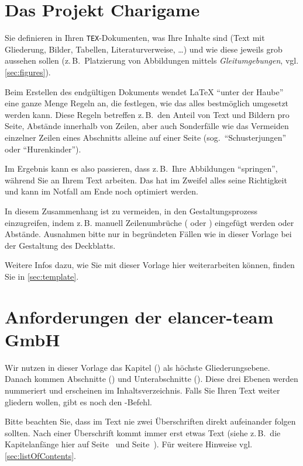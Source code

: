 \section{Das Projekt Charigame}
\label{sec:hood}
Sie definieren in Ihren \texttt{TEX}-Dokumenten, was Ihre Inhalte sind (Text mit Gliederung, Bilder, Tabellen, Literaturverweise, \ldots) und wie diese jeweils grob aussehen sollen (z.\,B.\ Platzierung von Abbildungen mittels \emph{Gleitumgebungen}, vgl. \cref{sec:figures}).
\par
Beim Erstellen des endgültigen Dokuments wendet \LaTeX{} \enquote{unter der Haube} eine ganze Menge Regeln an, die festlegen, wie das alles bestmöglich umgesetzt werden kann. Diese Regeln betreffen z.\,B.\ den Anteil von Text und Bildern pro Seite, Abstände innerhalb von Zeilen, aber auch Sonderfälle wie das Vermeiden einzelner Zeilen eines Abschnitts alleine auf einer Seite (sog.\ \enquote{Schusterjungen} oder \enquote{Hurenkinder}).
\par
Im Ergebnis kann es also passieren, dass z.\,B.\ Ihre Abbildungen \enquote{springen}, während Sie an Ihrem Text arbeiten. Das hat im Zweifel alles seine Richtigkeit und kann im Notfall am Ende noch optimiert werden.
\par
In diesem Zusammenhang ist zu vermeiden, in den Gestaltungsprozess einzugreifen, indem z.\,B. manuell Zeilenumbrüche ( oder \comm{\textbackslash}) eingefügt werden oder Abstände. Ausnahmen bitte nur in begründeten Fällen wie in dieser Vorlage bei der Gestaltung des Deckblatts.
\par
Weitere Infos dazu, wie Sie mit dieser Vorlage hier weiterarbeiten können, finden Sie in \cref{sec:template}.
%
%
\section{Anforderungen der elancer-team GmbH}
\label{sec:headings}
Wir nutzen in dieser Vorlage das Kapitel () als höchste Gliederungsebene. Danach kommen Abschnitte () und Unterabschnitte (). Diese drei Ebenen werden nummeriert und erscheinen im Inhaltsverzeichnis. Falls Sie Ihren Text weiter gliedern wollen, gibt es noch den -Befehl.
\par
Bitte beachten Sie, dass im Text nie zwei Überschriften direkt aufeinander folgen sollten. Nach einer Überschrift kommt immer erst etwas Text (siehe z.\,B.\ die Kapitelanfänge hier auf Seite~\pageref{chap:formal} und Seite~\pageref{chap:Textsatz}). Für weitere Hinweise vgl. \cref{sec:listOfContents}.
%
%
